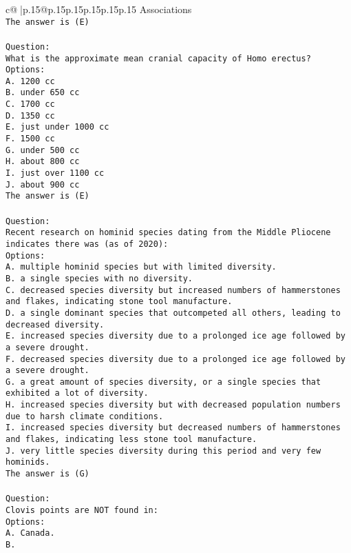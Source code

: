 \documentclass{article}
\begin{document}
{\begin{supertabular}{c@{$\;$}|p{.15\linewidth}@{}p{.15\linewidth}p{.15\linewidth}p{.15\linewidth}p{.15\linewidth}p{.15\linewidth}}
{{{Associations\\ \tt The answer is (E)\\ \tt \\ \tt Question:\\ \tt What is the approximate mean cranial capacity of Homo erectus?\\ \tt Options:\\ \tt A. 1200 cc\\ \tt B. under 650 cc\\ \tt C. 1700 cc\\ \tt D. 1350 cc\\ \tt E. just under 1000 cc\\ \tt F. 1500 cc\\ \tt G. under 500 cc\\ \tt H. about 800 cc\\ \tt I. just over 1100 cc\\ \tt J. about 900 cc\\ \tt The answer is (E)\\ \tt \\ \tt Question:\\ \tt Recent research on hominid species dating from the Middle Pliocene indicates there was (as of 2020):\\ \tt Options:\\ \tt A. multiple hominid species but with limited diversity.\\ \tt B. a single species with no diversity.\\ \tt C. decreased species diversity but increased numbers of hammerstones and flakes, indicating stone tool manufacture.\\ \tt D. a single dominant species that outcompeted all others, leading to decreased diversity.\\ \tt E. increased species diversity due to a prolonged ice age followed by a severe drought.\\ \tt F. decreased species diversity due to a prolonged ice age followed by a severe drought.\\ \tt G. a great amount of species diversity, or a single species that exhibited a lot of diversity.\\ \tt H. increased species diversity but with decreased population numbers due to harsh climate conditions.\\ \tt I. increased species diversity but decreased numbers of hammerstones and flakes, indicating less stone tool manufacture.\\ \tt J. very little species diversity during this period and very few hominids.\\ \tt The answer is (G)\\ \tt \\ \tt Question:\\ \tt Clovis points are NOT found in:\\ \tt Options:\\ \tt A. Canada.\\ \tt B. }}}
\end{supertabular}}
\end{document}
